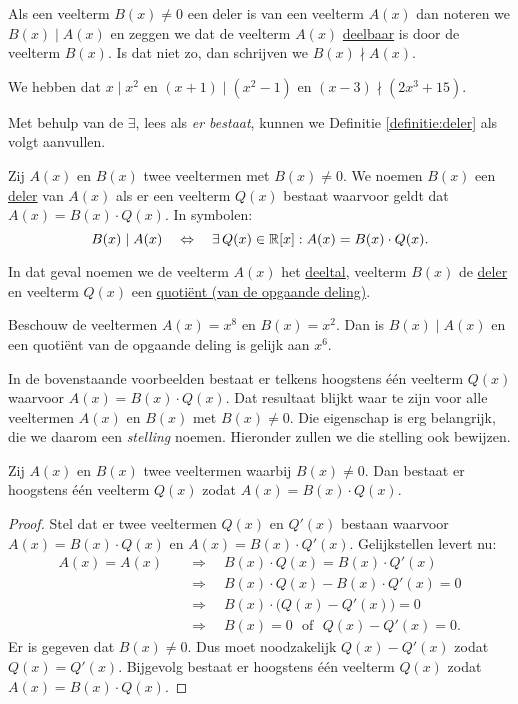 \documentclass{ximera}
\begin{document}
Als een veelterm $B(x) \neq 0$ een deler is van een veelterm $A(x)$ dan noteren we $B(x) \mid A(x)$ en zeggen we dat de veelterm $A(x)$ \underline{deelbaar} is door de veelterm $B(x)$. Is dat niet zo, dan schrijven we $B(x) \nmid A(x)$. 

\begin{example} 
We hebben dat $x \mid x^2$ en $(x+1) \mid (x^2-1)$ en $(x-3) \nmid (2x^3+15)$.
\end{example}

Met behulp van de  $\exists$, lees als {\em er bestaat}, kunnen we Definitie \ref{definitie:deler} als volgt aanvullen.

\begin{definition}
Zij $A(x)$ en $B(x)$ twee veeltermen met $B(x) \neq 0$. We noemen $B(x)$ een \underline{deler} van $A(x)$ als er een veelterm $Q(x)$ bestaat waarvoor geldt dat $A(x) = B(x)\cdot Q(x)$. In symbolen:
\[
B(x) \mid A(x) \quad \Leftrightarrow \quad \exists \, Q(x) \in \mathbb{R}[x]: A(x) = B(x)\cdot Q(x).
\]
\end{definition}

In dat geval noemen we de veelterm $A(x)$ het \underline{deeltal}, veelterm $B(x)$ de \underline{deler} en veelterm $Q(x)$ een \underline{quoti\"ent (van de opgaande deling)}. 

\begin{example}
Beschouw de veeltermen $A(x) = x^8$ en $B(x) = x^2$. Dan is $B(x) \mid A(x)$ en een quoti\"ent van de opgaande deling is gelijk aan $x^6$. 
\end{example}

In de bovenstaande voorbeelden bestaat er telkens hoogstens \'e\'en veelterm $Q(x)$ waarvoor $A(x) = B(x)\cdot Q(x)$. Dat resultaat blijkt waar te zijn voor alle veeltermen $A(x)$ en $B(x)$ met $B(x) \neq 0$. Die eigenschap is erg belangrijk, die we daarom een {\em stelling} noemen. Hieronder zullen we die stelling ook bewijzen. 

\begin{stelling}
Zij $A(x)$ en $B(x)$ twee veeltermen waarbij $B(x) \neq 0$. Dan bestaat er hoogstens \'e\'en veelterm $Q(x)$ zodat $A(x) = B(x)\cdot Q(x)$. 
\end{stelling}
\begin{proof}
Stel dat er twee veeltermen $Q(x)$ en $Q'(x)$ bestaan waarvoor $A(x) = B(x)\cdot Q(x)$ en $A(x) = B(x)\cdot Q'(x)$. Gelijkstellen levert nu:
\begin{align*}
A(x) = A(x) \quad & \Rightarrow \quad B(x)\cdot Q(x) = B(x)\cdot Q'(x) \\
& \Rightarrow \quad B(x)\cdot Q(x) - B(x)\cdot Q'(x) = 0 \\
& \Rightarrow \quad B(x) \cdot \bigl(Q(x) - Q'(x) \bigr) = 0 \\
& \Rightarrow \quad B(x) = 0 \,\,\text{ of } \,\, Q(x) - Q'(x) = 0. 
\end{align*}
Er is gegeven dat $B(x) \neq 0$. Dus moet noodzakelijk $Q(x) - Q'(x)$ zodat $Q(x) = Q'(x)$. Bijgevolg bestaat er hoogstens \'e\'en veelterm $Q(x)$ zodat $A(x) = B(x)\cdot Q(x)$.
\end{proof}
\end{document}
